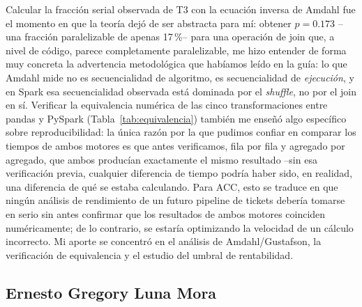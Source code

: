 \documentclass[11pt,a4paper]{article}
\begin{document}
Calcular la fracci\'on serial observada de T3 con la ecuaci\'on inversa de
Amdahl fue el momento en que la teor\'ia dej\'o de ser abstracta para m\'i:
obtener $p=0.173$ --una fracci\'on paralelizable de apenas 17\,\%-- para una
operaci\'on de join que, a nivel de c\'odigo, parece completamente
paralelizable, me hizo entender de forma muy concreta la advertencia
metodol\'ogica que hab\'iamos le\'ido en la gu\'ia: lo que Amdahl mide no es
secuencialidad de algoritmo, es secuencialidad de \emph{ejecuci\'on}, y en
Spark esa secuencialidad observada est\'a dominada por el \emph{shuffle}, no
por el join en s\'i. Verificar la equivalencia num\'erica de las cinco
transformaciones entre pandas y PySpark (Tabla~\ref{tab:equivalencia}) tambi\'en
me ense\~n\'o algo espec\'ifico sobre reproducibilidad: la \'unica raz\'on por
la que pudimos confiar en comparar los tiempos de ambos motores es que antes
verificamos, fila por fila y agregado por agregado, que ambos produc\'ian
exactamente el mismo resultado --sin esa verificaci\'on previa, cualquier
diferencia de tiempo podr\'ia haber sido, en realidad, una diferencia de qu\'e
se estaba calculando. Para ACC, esto se traduce en que ning\'un an\'alisis de
rendimiento de un futuro pipeline de tickets deber\'ia tomarse en serio sin
antes confirmar que los resultados de ambos motores coinciden num\'ericamente;
de lo contrario, se estar\'ia optimizando la velocidad de un c\'alculo
incorrecto. Mi aporte se concentr\'o en el an\'alisis de Amdahl/Gustafson, la
verificaci\'on de equivalencia y el estudio del umbral de rentabilidad.

\subsection*{Ernesto Gregory Luna Mora}
\end{document}
